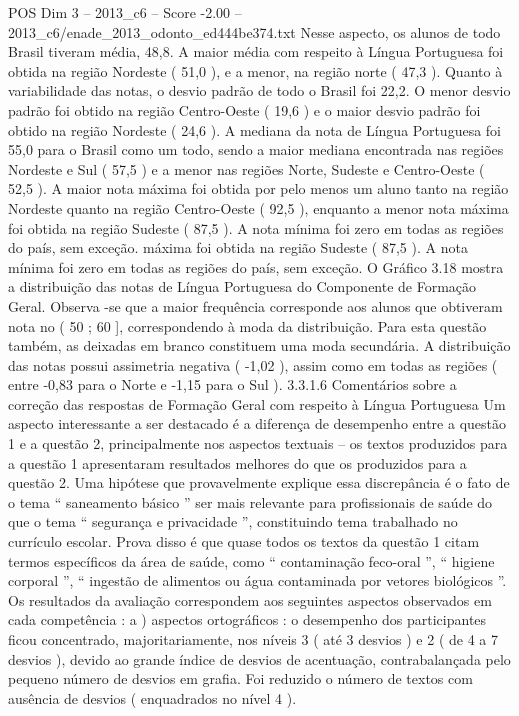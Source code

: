\begin{textsample}{POS Dim 3 – 2013\_c6 – Score -2.00 – 2013\_c6/enade\_2013\_odonto\_ed444be374.txt}
Nesse aspecto, os alunos de todo Brasil tiveram média, 48,8.
A maior média com respeito à Língua Portuguesa foi obtida na região Nordeste ( 51,0 ), e a menor, na região norte ( 47,3 ).
Quanto à variabilidade das notas, o desvio padrão de todo o Brasil foi 22,2.
O menor desvio padrão foi obtido na região Centro-Oeste ( 19,6 ) e o maior desvio padrão foi obtido na região Nordeste ( 24,6 ).
A mediana da nota de Língua Portuguesa foi 55,0 para o Brasil como um todo, sendo a maior mediana encontrada nas regiões Nordeste e Sul ( 57,5 ) e a menor nas regiões Norte, Sudeste e Centro-Oeste ( 52,5 ).
A maior nota máxima foi obtida por pelo menos um aluno tanto na região Nordeste quanto na região Centro-Oeste ( 92,5 ), enquanto a menor nota máxima foi obtida na região Sudeste ( 87,5 ).
A nota mínima foi zero em todas as regiões do país, sem exceção. máxima foi obtida na região Sudeste ( 87,5 ).
A nota mínima foi zero em todas as regiões do país, sem exceção.
O Gráfico 3.18 mostra a distribuição das notas de Língua Portuguesa do Componente de Formação Geral.
Observa -se que a maior frequência corresponde aos alunos que obtiveram nota no ( 50 ; 60 ], correspondendo à moda da distribuição.
Para esta questão também, as deixadas em branco constituem uma moda secundária.
A distribuição das notas possui assimetria negativa ( -1,02 ), assim como em todas as regiões ( entre -0,83 para o Norte e -1,15 para o Sul ). 3.3.1.6 Comentários sobre a correção das respostas de Formação Geral com respeito à Língua Portuguesa Um aspecto interessante a ser destacado é a diferença de desempenho entre a questão 1 e a questão 2, principalmente nos aspectos textuais – os textos produzidos para a questão 1 apresentaram resultados melhores do que os produzidos para a questão 2.
Uma hipótese que provavelmente explique essa discrepância é o fato de o tema “ saneamento básico ” ser mais relevante para profissionais de saúde do que o tema “ segurança e privacidade ”, constituindo tema trabalhado no currículo escolar.
Prova disso é que quase todos os textos da questão 1 citam termos específicos da área de saúde, como “ contaminação feco-oral ”, “ higiene corporal ”, “ ingestão de alimentos ou água contaminada por vetores biológicos ”.
Os resultados da avaliação correspondem aos seguintes aspectos observados em cada competência : a ) aspectos ortográficos : o desempenho dos participantes ficou concentrado, majoritariamente, nos níveis 3 ( até 3 desvios ) e 2 ( de 4 a 7 desvios ), devido ao grande índice de desvios de acentuação, contrabalançada pelo pequeno número de desvios em grafia.
Foi reduzido o número de textos com ausência de desvios ( enquadrados no nível 4 ).

\end{textsample}
